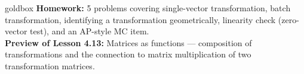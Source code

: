 \documentclass[10pt]{article}
\begin{document}
\begin{skillbox}{goldbox}
    \textbf{Homework:} 5 problems covering single-vector transformation, batch transformation,
    identifying a transformation geometrically, linearity check (zero-vector test), and an
    AP-style MC item.\\[4pt]
    \textbf{Preview of Lesson 4.13:} Matrices as functions --- composition of transformations
    and the connection to matrix multiplication of two transformation matrices.
\end{skillbox}
\end{document}
